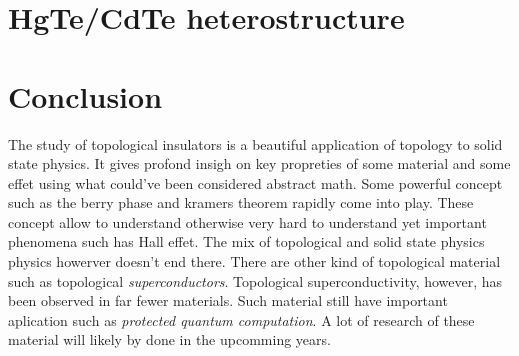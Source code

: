 

\section{\label{sec:ti_exemples} HgTe/CdTe heterostructure}

\section{\label{sec:concl} Conclusion}

The study of topological insulators is a beautiful application of topology to solid state physics. It gives profond insigh on key propreties of some material and some effet using what could've been considered abstract math. Some powerful concept such as the berry phase and kramers theorem rapidly come into play. These concept allow to understand otherwise very hard to understand yet important phenomena such has Hall effet. The mix of topological and solid state physics physics howerver doesn't end there. There are other kind of topological material such as topological \textit{superconductors}. Topological superconductivity, however, has been observed in far fewer materials. Such material still have important aplication such as \textit{protected quantum computation}. \cite{nayak_evidence_2021} A lot of research of these material will likely by done in the upcomming years.









